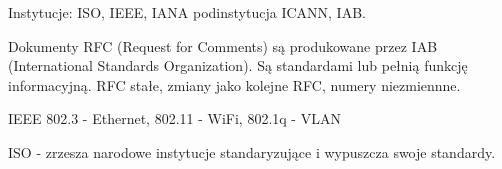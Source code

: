 \documentclass[../main.tex]{subfiles}
\begin{document}
    Instytucje: ISO, IEEE, IANA podinstytucja ICANN, IAB.

    Dokumenty RFC (Request for Comments) są produkowane przez IAB (International Standards Organization).
    Są standardami lub pełnią funkcję informacyjną.
    RFC stałe, zmiany jako kolejne RFC, numery niezmiennne.

    IEEE 802.3 - Ethernet, 802.11 - WiFi, 802.1q - VLAN

    ISO - zrzesza narodowe instytucje standaryzujące i wypuszcza swoje standardy.
\end{document}
